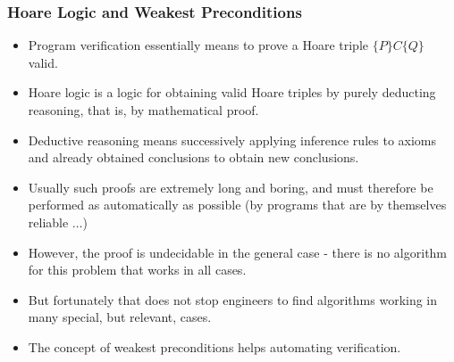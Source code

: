 \begin{multicols}{2}
\subsubsection{Hoare Logic and Weakest Preconditions}
\begin{itemize}
  \item Program verification essentially means to prove a Hoare triple $\{P\}C\{Q\}$ valid.
  \item Hoare logic is a logic for obtaining valid Hoare triples by purely deducting reasoning, that is, by mathematical proof.
  \item Deductive reasoning means successively applying inference rules to axioms and already obtained conclusions to obtain new conclusions.
  \item Usually such proofs are extremely long and boring, and must therefore be performed as automatically as possible (by programs that are by themselves reliable $\ldots$)
  \item However, the proof is undecidable in the general case - there is no algorithm for this problem that works in all cases.
  \item But fortunately that does not stop engineers to find algorithms working in many special, but relevant, cases.
  \item The concept of weakest preconditions helps automating verification.
\end{itemize}


\end{multicols}
